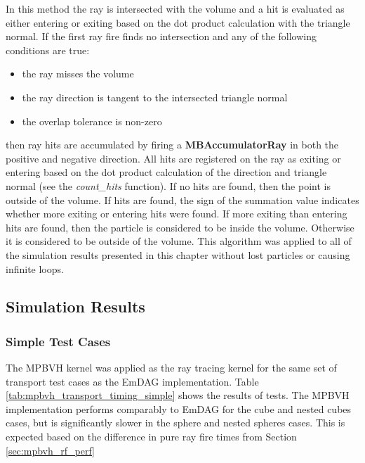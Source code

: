 In this method the ray is intersected with the volume and a hit is evaluated as
either entering or exiting based on the dot product calculation with the
triangle normal. If the first ray fire finds no intersection and any of the
following conditions are true:

\begin{itemize}
  \item the ray misses the volume
  \item the ray direction is tangent to the intersected triangle normal
  \item the overlap tolerance is non-zero
\end{itemize}

then ray hits are accumulated by firing a \textbf{MBAccumulatorRay} in both the
positive and negative direction. All hits are registered on the ray as exiting
or entering based on the dot product calculation of the direction and triangle
normal (see the \textit{count\_hits} function). If no hits are found, then the
point is outside of the volume. If hits are found, the sign of the summation
value indicates whether more exiting or entering hits were found. If more
exiting than entering hits are found, then the particle is considered to be
inside the volume. Otherwise it is considered to be outside of the volume. This
algorithm was applied to all of the simulation results presented in this chapter
without lost particles or causing infinite loops.

\subsection{Simulation Results}

\subsubsection{Simple Test Cases}\label{subsec:mpbvh_simple_tests}
The MPBVH kernel was applied as the ray tracing kernel for the same set of
transport test cases as the EmDAG implementation. Table
\ref{tab:mpbvh_transport_timing_simple} shows the results of tests. The MPBVH
implementation performs comparably to EmDAG for the cube and nested cubes cases,
but is significantly slower in the sphere and nested spheres cases. This is
expected based on the difference in pure ray fire times from Section
\ref{sec:mpbvh_rf_perf}

